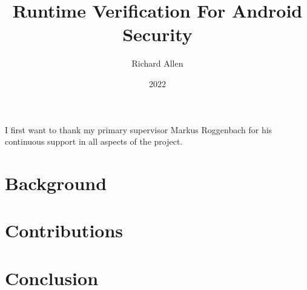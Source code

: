 \documentclass[11pt, a4paper, twoside]{custard}
\title{Runtime Verification For Android Security}
\author{Richard Allen}
\date{2022}
\begin{document}
\frontmatter %

\maketitle
\declaration



\begin{Acknowledgements}
I first want to thank my primary supervisor Markus Roggenbach for his continuous support in all aspects of the project.
\end{Acknowledgements} 


\tableofcontents*

\restoregeometry

\mainmatter %



\part{Background}








\part{Contributions}







\part{Conclusion}






\appendix
{}








\restoregeometry
\end{document}
